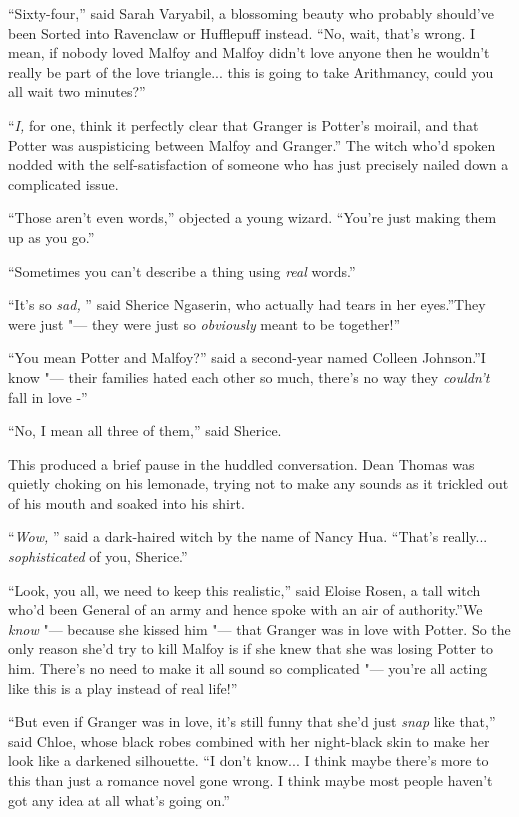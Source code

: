 ``Sixty-four,'' said Sarah Varyabil, a blossoming beauty who probably
should've been Sorted into Ravenclaw or Hufflepuff instead. ``No, wait,
that's wrong. I mean, if nobody loved Malfoy and Malfoy didn't love
anyone then he wouldn't really be part of the love triangle... this
is going to take Arithmancy, could you all wait two minutes?''

``\emph{I,} for one, think it perfectly clear that Granger is Potter's
moirail, and that Potter was auspisticing between Malfoy and Granger.''
The witch who'd spoken nodded with the self-satisfaction of someone who
has just precisely nailed down a complicated issue.

``Those aren't even words,'' objected a young wizard. ``You're just
making them up as you go.''

``Sometimes you can't describe a thing using \emph{real} words.''

``It's so \emph{sad,} '' said Sherice Ngaserin, who actually had tears in
her eyes.''They were just "--- they were just so \emph{obviously} meant to
be together!''

``You mean Potter and Malfoy?'' said a second-year named Colleen
Johnson.''I know "--- their families hated each other so much, there's no
way they \emph{couldn't} fall in love -''

``No, I mean all three of them,'' said Sherice.

This produced a brief pause in the huddled conversation. Dean Thomas was
quietly choking on his lemonade, trying not to make any sounds as it
trickled out of his mouth and soaked into his shirt.

``\emph{Wow,} '' said a dark-haired witch by the name of Nancy Hua.
``That's really... \emph{sophisticated} of you, Sherice.''

``Look, you all, we need to keep this realistic,'' said Eloise Rosen, a
tall witch who'd been General of an army and hence spoke with an air of
authority.''We \emph{know} "--- because she kissed him "--- that Granger was
in love with Potter. So the only reason she'd try to kill Malfoy is if
she knew that she was losing Potter to him. There's no need to make it
all sound so complicated "--- you're all acting like this is a play instead
of real life!''

``But even if Granger was in love, it's still funny that she'd just
\emph{snap} like that,'' said Chloe, whose black robes combined with her
night-black skin to make her look like a darkened silhouette. ``I don't
know... I think maybe there's more to this than just a romance
novel gone wrong. I think maybe most people haven't got any idea at all
what's going on.''

